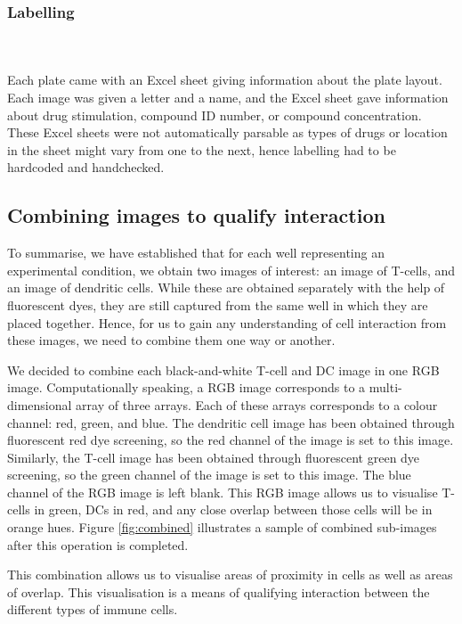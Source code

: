 \bigskip
\subsubsection{Labelling}

\hfill\\
\hfill\\
Each plate came with an Excel sheet giving information about the plate layout. Each image was given a letter and a name, and the Excel sheet gave information about drug stimulation, compound ID number, or compound concentration. These Excel sheets were not automatically parsable as types of drugs or location in the sheet might vary from one to the next, hence labelling had to be hardcoded and handchecked.

\subsection{Combining images to qualify interaction} \label{subsec:combining}

To summarise, we have established that for each well representing an experimental condition, we obtain two images of interest: an image of T-cells, and an image of dendritic cells. While these are obtained separately with the help of fluorescent dyes, they are still captured from the same well in which they are placed together. Hence, for us to gain any understanding of cell interaction from these images, we need to combine them one way or another.

We decided to combine each black-and-white T-cell and DC image in one RGB image. Computationally speaking, a RGB image corresponds to a multi-dimensional array of three arrays. Each of these arrays corresponds to a colour channel: red, green, and blue. The dendritic cell image has been obtained through fluorescent red dye screening, so the red channel of the image is set to this image. Similarly, the T-cell image has been obtained through fluorescent green dye screening, so the green channel of the image is set to this image. The blue channel of the RGB image is left blank. This RGB image allows us to visualise T-cells in green, DCs in red, and any close overlap between those cells will be in orange hues. Figure \ref{fig:combined} illustrates a sample of combined sub-images after this operation is completed.

This combination allows us to visualise areas of proximity in cells as well as areas of overlap. This visualisation is a means of qualifying interaction between the different types of immune cells.


